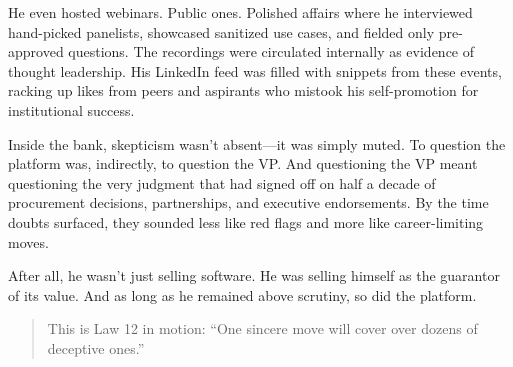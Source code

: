 He even hosted webinars. Public ones. Polished affairs where he interviewed hand-picked panelists, showcased sanitized use cases, and fielded only pre-approved questions. The recordings were circulated internally as evidence of thought leadership. His LinkedIn feed was filled with snippets from these events, racking up likes from peers and aspirants who mistook his self-promotion for institutional success.

Inside the bank, skepticism wasn’t absent—it was simply muted. To question the platform was, indirectly, to question the VP. And questioning the VP meant questioning the very judgment that had signed off on half a decade of procurement decisions, partnerships, and executive endorsements. By the time doubts surfaced, they sounded less like red flags and more like career-limiting moves.

After all, he wasn’t just selling software. He was selling himself as the guarantor of its value. And as long as he remained above scrutiny, so did the platform.

\medskip

\begin{quote}
This is Law 12 in motion: ``One sincere move will cover over dozens of deceptive ones.''
\end{quote}

